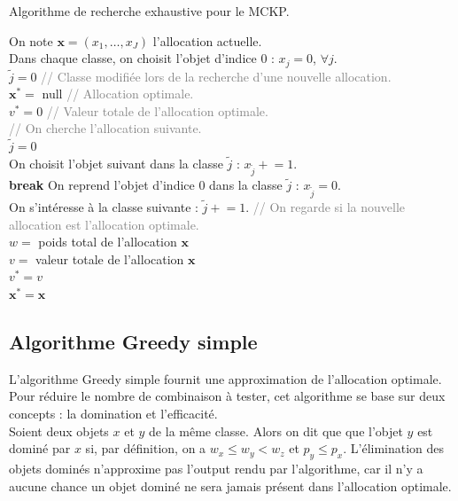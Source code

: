 \documentclass{article}
\newcommand{\pluseq}{\mathrel{+}=}
\newcommand\comm[1]{\footnotesize\ttfamily\textcolor{gray}{// #1}}
\begin{document}
\begin{algorithm}[!ht]
\caption{Algorithme de recherche exhaustive pour le MCKP.}
\label{alg:recherche-exhaustive}
\small
{}
On note $\mathbf{x} = (x_1, \dots, x_J)$ l'allocation actuelle.\\
Dans chaque classe, on choisit l'objet d'indice 0 : $x_j = 0$, $\forall j$.\\
$\tilde{j}=0$ \comm{Classe modifiée lors de la recherche d'une nouvelle allocation.}\\
$\mathbf{x}^{*} = $ null \comm{Allocation optimale.}\\
$v^{*} = 0$ \comm{Valeur totale de l'allocation optimale.}\\
{
	\comm{On cherche l'allocation suivante.}\\
	$\tilde{j} = 0$\\
	{
		{
			On choisit l'objet suivant dans la classe $\tilde{j}$ : $x_{\tilde{j}} \pluseq 1$.\\
			\textbf{break}
		}
		{
			On reprend l'objet d'indice 0 dans la classe $\tilde{j}$ : $x_{\tilde{j}} = 0$.\\
			On s'intéresse à la classe suivante : $\tilde{j} \pluseq 1$.
		}
	}
	\comm{On regarde si la nouvelle allocation est l'allocation optimale.}\\
	$w =$ poids total de l'allocation $\mathbf{x}$\\
	{
		$v =$ valeur totale de l'allocation $\mathbf{x}$\\
		{
			$v^{*} = v$\\
			$\mathbf{x}^{*} = \mathbf{x}$\\
		}
	}
}
\end{algorithm}

\subsection{Algorithme Greedy simple}
L'algorithme Greedy simple fournit une approximation de l'allocation optimale. Pour réduire le nombre de combinaison à tester, cet algorithme se base sur deux concepts : la domination et l'efficacité.\\
Soient deux objets $x$ et $y$ de la même classe. Alors on dit que que l'objet $y$ est dominé par $x$ si, par définition, on a $w_{x} \leq w_{y} < w_{z}$ et $p_y \leq p_x$. L'élimination des objets dominés n'approxime pas l'output rendu par l'algorithme, car il n'y a aucune chance un objet dominé ne sera jamais présent dans l'allocation optimale.
\end{document}
